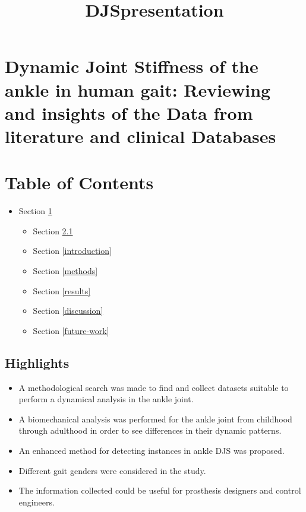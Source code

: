 \documentclass[11pt]{article}
\title{DJSpresentation}
\providecommand{\tightlist}{%
      \setlength{\itemsep}{0pt}\setlength{\parskip}{0pt}}
\begin{document}
    
    
    \maketitle
    
    

    
    \hypertarget{dynamic-joint-stiffness-of-the-ankle-in-human-gait-reviewing-and-insights-of-the-data-from-literature-and-clinical-databases}{%
\section{Dynamic Joint Stiffness of the ankle in human gait: Reviewing
and insights of the Data from literature and clinical
Databases}\label{dynamic-joint-stiffness-of-the-ankle-in-human-gait-reviewing-and-insights-of-the-data-from-literature-and-clinical-databases}}

    \hypertarget{table-of-contents}{%
\section{Table of Contents}\label{table-of-contents}}

\begin{itemize}
\tightlist
\item
  Section \ref{dynamic-joint-stiffness-of-the-ankle-in-human-gait-reviewing-and-insights-of-the-data-from-literature-and-clinical-databases}

  \begin{itemize}
  \tightlist
  \item
    Section \ref{highlights}
  \item
    Section \ref{introduction}
  \item
    Section \ref{methods}
  \item
    Section \ref{results}
  \item
    Section \ref{discussion}
  \item
    Section \ref{future-work}
  \end{itemize}
\end{itemize}

    \hypertarget{highlights}{%
\subsection{Highlights}\label{highlights}}

    \begin{itemize}
\tightlist
\item
  A methodological search was made to find and collect datasets suitable
  to perform a dynamical analysis in the ankle joint.
\item
  A biomechanical analysis was performed for the ankle joint from
  childhood through adulthood in order to see differences in their
  dynamic patterns.
\item
  An enhanced method for detecting instances in ankle DJS was proposed.
\item
  Different gait genders were considered in the study.
\item
  The information collected could be useful for prosthesis designers and
  control engineers.
\end{itemize}
\end{document}
